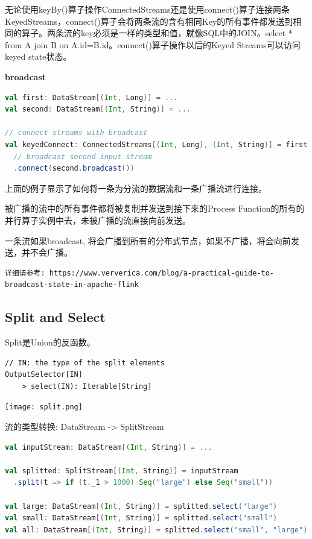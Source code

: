 \documentclass[oneside]{ctexbook}
\begin{document}
无论使用keyBy()算子操作ConnectedStreams还是使用connect()算子连接两条KeyedStreams，connect()算子会将两条流的含有相同Key的所有事件都发送到相同的算子。两条流的key必须是一样的类型和值，就像SQL中的JOIN。select * from A join B on A.id=B.id。connect()算子操作以后的Keyed Streams可以访问keyed state状态。

\textbf{broadcast}

\begin{lstlisting}[language=scala, breaklines]
val first: DataStream[(Int, Long)] = ...
val second: DataStream[(Int, String)] = ...

// connect streams with broadcast
val keyedConnect: ConnectedStreams[(Int, Long), (Int, String)] = first
  // broadcast second input stream
  .connect(second.broadcast())
\end{lstlisting}

上面的例子显示了如何将一条为分流的数据流和一条广播流进行连接。

被广播的流中的所有事件都将被复制并发送到接下来的Process Function的所有的并行算子实例中去，未被广播的流直接向前发送。

一条流如果broadcast, 将会广播到所有的分布式节点，如果不广播，将会向前发送，并不会广播。

\begin{lstlisting}
详细请参考: https://www.ververica.com/blog/a-practical-guide-to-broadcast-state-in-apache-flink
\end{lstlisting}

\subsection{Split and Select}

Split是Union的反函数。

\begin{lstlisting}
// IN: the type of the split elements
OutputSelector[IN]
    > select(IN): Iterable[String]
\end{lstlisting}

\noindent \texttt{[image: split.png]}

流的类型转换: DataStream -> SplitStream

\begin{lstlisting}[language=scala, breaklines]
val inputStream: DataStream[(Int, String)] = ...

val splitted: SplitStream[(Int, String)] = inputStream
  .split(t => if (t._1 > 1000) Seq("large") else Seq("small"))

val large: DataStream[(Int, String)] = splitted.select("large")
val small: DataStream[(Int, String)] = splitted.select("small")
val all: DataStream[(Int, String)] = splitted.select("small", "large")
\end{lstlisting}
\end{document}
